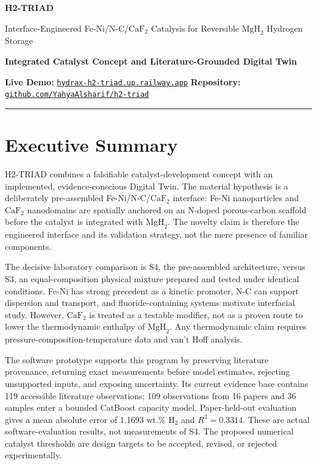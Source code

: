 \documentclass[11pt,a4paper]{article}
\newcommand{\MgHtwo}{\ensuremath{\mathrm{MgH}_{2}}}
\newcommand{\Htwo}{\ensuremath{\mathrm{H}_{2}}}
\newcommand{\CaFtwo}{\ensuremath{\mathrm{CaF}_{2}}}
\newcommand{\wtpct}{wt.\%}
\begin{document}
\begin{center}
  {\color{HydraNavy}\LARGE\bfseries H2-TRIAD\par}
  \vspace{0.35em}
  {\large Interface-Engineered Fe-Ni/N-C/\CaFtwo{} Catalysis for Reversible \MgHtwo{} Hydrogen Storage\par}
  \vspace{0.4em}
  {\normalsize\color{HydraTeal}\bfseries Integrated Catalyst Concept and Literature-Grounded Digital Twin\par}
  \vspace{0.75em}
  {\small
  \textbf{Live Demo:} \href{https://hydrax-h2-triad.up.railway.app}{\nolinkurl{hydrax-h2-triad.up.railway.app}}\quad
  \textbf{Repository:} \href{https://github.com/YahyaAlsharif/h2-triad}{\nolinkurl{github.com/YahyaAlsharif/h2-triad}}\par}
\end{center}

\vspace{0.45em}
\hrule
\vspace{0.75em}

\section*{Executive Summary}

H2-TRIAD combines a falsifiable catalyst-development concept with an implemented, evidence-conscious Digital Twin. The material hypothesis is a deliberately pre-assembled Fe-Ni/N-C/\CaFtwo{} interface: Fe-Ni nanoparticles and \CaFtwo{} nanodomains are spatially anchored on an N-doped porous-carbon scaffold before the catalyst is integrated with \MgHtwo{}. The novelty claim is therefore the engineered interface and its validation strategy, not the mere presence of familiar components.

The decisive laboratory comparison is S4, the pre-assembled architecture, versus S3, an equal-composition physical mixture prepared and tested under identical conditions. Fe-Ni has strong precedent as a kinetic promoter, N-C can support dispersion and transport, and fluoride-containing systems motivate interfacial study. However, \CaFtwo{} is treated as a testable modifier, not as a proven route to lower the thermodynamic enthalpy of \MgHtwo{}. Any thermodynamic claim requires pressure-composition-temperature data and van't Hoff analysis.

The software prototype supports this program by preserving literature provenance, returning exact measurements before model estimates, rejecting unsupported inputs, and exposing uncertainty. Its current evidence base contains 119 accessible literature observations; 109 observations from 16 papers and 36 samples enter a bounded CatBoost capacity model. Paper-held-out evaluation gives a mean absolute error of 1.1693 \wtpct{} \Htwo{} and $R^{2}=0.3314$. These are actual software-evaluation results, not measurements of S4. The proposed numerical catalyst thresholds are design targets to be accepted, revised, or rejected experimentally.
\end{document}
